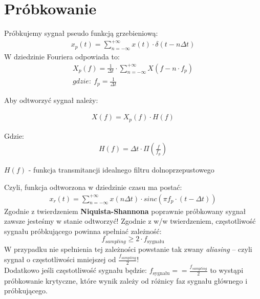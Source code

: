  \newpage
 \section{Próbkowanie}
    \tab Próbkujemy sygnał pseudo funkcją grzebieniową:
    \begin{gather*}
        x_p(t) = \sum_{n=-\infty}^{+\infty}x(t)\cdot \delta(t-n\Delta t)
    \end{gather*}
    W dziedzinie Fouriera odpowiada to:
    \begin{gather*}
        X_p(f) = \frac{1}{\Delta t} \cdot \sum_{n=-\infty}^{+\infty} X(f-n\cdot f_p)\\
        gdzie:\ f_p = \frac{1}{\Delta t}
    \end{gather*}

    \noindent Aby odtworzyć sygnał należy:
    \begin{multicols}{2}
        \begin{gather*}
            X(f) = X_p(f)\cdot H(f)
        \end{gather*}
        
        Gdzie:
        \begin{gather*}
            H(f) = \Delta t \cdot\Pi\left(\frac{f}{f_p}\right)
        \end{gather*}
    \end{multicols}
    \begin{center}
        $H(f)$ - funkcja transmitancji idealnego filtru dolnoprzepustowego
    \end{center}
    Czyli, funkcja odtworzona w dziedzinie czasu ma postać:
    \begin{gather*}
        x_r(t) = \sum_{n=-\infty}^{+\infty} x(n\Delta t) \cdot sinc(\pi f_p \cdot
        (t-\Delta t))
    \end{gather*}
    Zgodnie z twierdzeniem \textbf{Niquista-Shannona} poprawnie próbkowany sygnał zawsze jesteśmy w stanie odtworzyć!
    Zgodnie z w/w twierdzeniem, częstotliwość sygnału próbkującego powinna spełniać zależność:
    \begin{equation*}
        f_{sampling} \ge 2\cdot f_{\text{sygnału}}
    \end{equation*}
    W przypadku nie spełnienia tej zależności powstanie tak zwany \textit{aliasing} -- czyli sygnał o częstotliwości mniejszej od $\frac{f_{sampling}}{2}$!\\
    Dodatkowo jeśli częstotliwość sygnału będzie: $f_{\text{sygnału}} == \frac{f_{sampling}}{2}$ to wystąpi próbkowanie krytyczne, które wynik zależy od różnicy faz sygnału głównego i próbkującego.
    